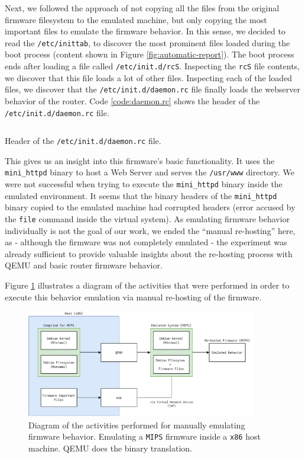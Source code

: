 Next, we followed the approach of not copying all the files from the original firmware filesystem to the emulated machine, but only copying the most important files to emulate the firmware behavior. In this sense, we decided to read the {\tt /etc/inittab}, to discover the most prominent files loaded during the boot process (content shown in Figure \ref{fig:automatic-report}). The boot process ends after loading a file called {\tt /etc/init.d/rcS}. Inspecting the {\tt rcS} file contents, we discover that this file loads a lot of other files. Inspecting each of the loaded files, we discover that the {\tt /etc/init.d/daemon.rc} file finally loads the webserver behavior of the router. Code \ref{code:daemon.rc} shows the header of the {\tt /etc/init.d/daemon.rc} file.

\begin{listing}[!ht]
\inputminted[fontsize=\footnotesize]{bash}{Code/daemon.rc}
\caption{Header of the {\tt /etc/init.d/daemon.rc} file.}
\label{code:daemon.rc}
\end{listing}

This gives us an insight into this firmware's basic functionality. It uses the {\tt mini\_httpd} binary to host a Web Server and serves the {\tt /usr/www} directory. We were not successful when trying to execute the {\tt mini\_httpd} binary inside the emulated environment. It seems that the binary headers of the {\tt mini\_httpd} binary copied to the emulated machine had corrupted headers (error accused by the {\tt file} command inside the virtual system). As emulating firmware behavior individually is not the goal of our work, we ended the ``manual re-hosting'' here, as - although the firmware was not completely emulated - the experiment was already sufficient to provide valuable insights about the re-hosting process with QEMU and basic router firmware behavior.

Figure \ref{fig:illustrated-manual-rehosting} illustrates a diagram of the activities that were performed in order to execute this behavior emulation via manual re-hosting of the firmware.

\begin{figure}[H]
    \centering
    \includegraphics[width=0.9\textwidth]{figs/ManualReHosting.pdf}
    \caption{Diagram of the activities performed for manually emulating firmware behavior. Emulating a {\tt MIPS} firmware inside a {\tt x86} host machine. QEMU does the binary translation.}
    \label{fig:illustrated-manual-rehosting}
\end{figure}


